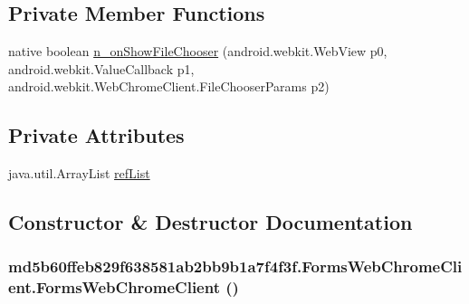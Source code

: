 \subsection*{Private Member Functions}
\begin{CompactItemize}
\item 
native boolean \hyperlink{classmd5b60ffeb829f638581ab2bb9b1a7f4f3f_1_1_forms_web_chrome_client_d8f4fdd59e647809da2cedab336eac27}{n\_\-onShowFileChooser} (android.webkit.WebView p0, android.webkit.ValueCallback p1, android.webkit.WebChromeClient.FileChooserParams p2)
\end{CompactItemize}
\subsection*{Private Attributes}
\begin{CompactItemize}
\item 
java.util.ArrayList \hyperlink{classmd5b60ffeb829f638581ab2bb9b1a7f4f3f_1_1_forms_web_chrome_client_070f1a439df90e372bf765d09f0fb0be}{refList}
\end{CompactItemize}


\subsection{Constructor \& Destructor Documentation}
\hypertarget{classmd5b60ffeb829f638581ab2bb9b1a7f4f3f_1_1_forms_web_chrome_client_c303a89a6191088c88020e6de82fe7db}{
\subsubsection[{FormsWebChromeClient}]{\setlength{\rightskip}{0pt plus 5cm}md5b60ffeb829f638581ab2bb9b1a7f4f3f.FormsWebChromeClient.FormsWebChromeClient ()}}
\label{classmd5b60ffeb829f638581ab2bb9b1a7f4f3f_1_1_forms_web_chrome_client_c303a89a6191088c88020e6de82fe7db}




